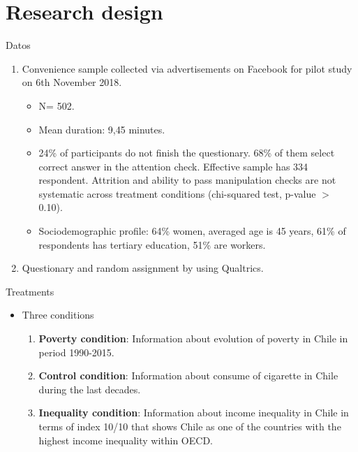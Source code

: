 \documentclass{beamer}
\begin{document}
\section{Research design}

\begin{frame}{Datos}

\begin{enumerate}
\justifying
\item Convenience sample collected via advertisements on Facebook for pilot study on 6th November 2018.
\medskip
		\begin{itemize}
		\justifying
		\item N= 502.
		\medskip
		\item Mean duration: 9,45 minutes.
		\medskip
		\item 24\% of participants do not finish the questionary. 68\% of them select correct answer in the attention check. Effective sample has 334 respondent. Attrition and ability to pass manipulation checks are not systematic across treatment conditions (chi-squared test, p-value $>$ 0.10).	
		\medskip
		\item Sociodemographic profile: 64\% women, averaged age is 45 years, 61\% of respondents has tertiary education, 51\% are workers.	
		\end{itemize}	
\medskip
\item Questionary and random assignment by using Qualtrics.			
\end{enumerate}

\end{frame}


\begin{frame}{Treatments}

\begin{itemize}
\justifying
\item Three conditions
\medskip
	\begin{enumerate}
	\justifying
	\item \textbf{Poverty condition}: Information about evolution of poverty in Chile in period 1990-2015.
	\medskip
	\medskip
	\item \textbf{Control condition}: Information about consume of cigarette in Chile during the last decades.
	\medskip
	\medskip
	\item \textbf{Inequality condition}: Information about income inequality in Chile in terms of index 10/10 that shows Chile as one of the countries with the highest income inequality within OECD. 
	\end{enumerate}	
\end{itemize}	
	
\end{frame}	
\end{document}
